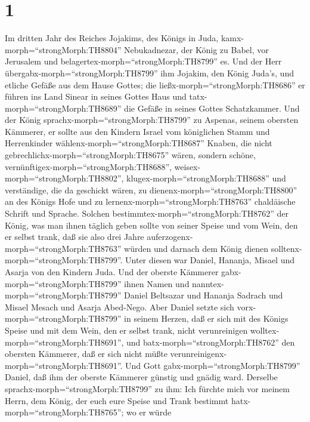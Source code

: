 \hypertarget{section}{%
\section{1}\label{section}}

 Im dritten Jahr des Reiches Jojakims, des Königs in Juda,
kamx-morph=``strongMorph:TH8804'' Nebukadnezar, der König zu Babel, vor
Jerusalem und belagertex-morph=``strongMorph:TH8799'' es. 
Und der Herr übergabx-morph=``strongMorph:TH8799'' ihm Jojakim, den
König Juda's, und etliche Gefäße aus dem Hause Gottes; die
ließx-morph=``strongMorph:TH8686'' er führen ins Land Sinear in seines
Gottes Haus und tatx-morph=``strongMorph:TH8689'' die Gefäße in seines
Gottes Schatzkammer.  Und der König
sprachx-morph=``strongMorph:TH8799'' zu Aspenas, seinem obersten
Kämmerer, er sollte aus den Kindern Israel vom königlichen Stamm und
Herrenkinder wählenx-morph=``strongMorph:TH8687''  Knaben,
die nicht gebrechlichx-morph=``strongMorph:TH8675'' wären, sondern
schöne, vernünftigex-morph=``strongMorph:TH8688'',
weisex-morph=``strongMorph:TH8802'', klugex-morph=``strongMorph:TH8688''
und verständige, die da geschickt wären, zu
dienenx-morph=``strongMorph:TH8800'' an des Königs Hofe und zu
lernenx-morph=``strongMorph:TH8763'' chaldäische Schrift und Sprache.
 Solchen bestimmtex-morph=``strongMorph:TH8762'' der König,
was man ihnen täglich geben sollte von seiner Speise und vom Wein, den
er selbst trank, daß sie also drei Jahre
auferzogenx-morph=``strongMorph:TH8763'' würden und darnach dem König
dienen solltenx-morph=``strongMorph:TH8799''.  Unter diesen
war Daniel, Hananja, Misael und Asarja von den Kindern Juda.
 Und der oberste Kämmerer gabx-morph=``strongMorph:TH8799''
ihnen Namen und nanntex-morph=``strongMorph:TH8799'' Daniel Beltsazar
und Hananja Sadrach und Misael Mesach und Asarja Abed-Nego. 
Aber Daniel setzte sich vorx-morph=``strongMorph:TH8799'' in seinem
Herzen, daß er sich mit des Königs Speise und mit dem Wein, den er
selbst trank, nicht verunreinigen wolltex-morph=``strongMorph:TH8691'',
und batx-morph=``strongMorph:TH8762'' den obersten Kämmerer, daß er sich
nicht müßte verunreinigenx-morph=``strongMorph:TH8691''. 
Und Gott gabx-morph=``strongMorph:TH8799'' Daniel, daß ihm der oberste
Kämmerer günstig und gnädig ward.  Derselbe
sprachx-morph=``strongMorph:TH8799'' zu ihm: Ich fürchte mich vor meinem
Herrn, dem König, der euch eure Speise und Trank bestimmt
hatx-morph=``strongMorph:TH8765''; wo er würde

